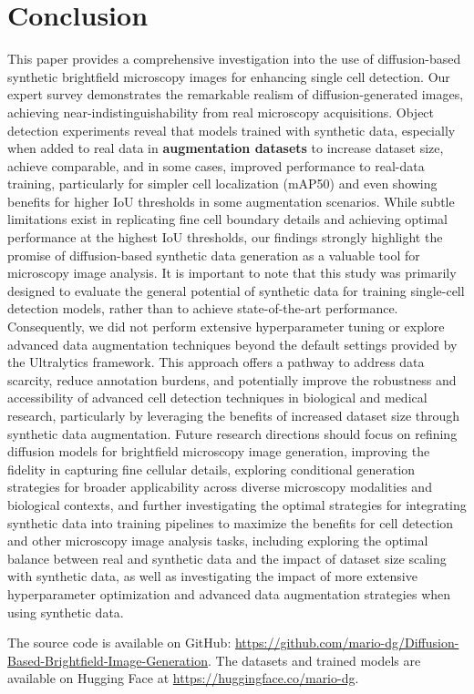 \section{Conclusion}
\label{sec:conclusion}
This paper provides a comprehensive investigation into the use of diffusion-based synthetic brightfield microscopy images for enhancing single cell detection.
Our expert survey demonstrates the remarkable realism of diffusion-generated images, achieving near-indistinguishability from real microscopy acquisitions.
Object detection experiments reveal that models trained with synthetic data, especially when added to real data in \textbf{augmentation datasets} to increase dataset size, achieve comparable, and in some cases,
improved performance to real-data training, particularly for simpler cell localization (mAP\@50) and even showing benefits for higher IoU thresholds in some augmentation scenarios.
While subtle limitations exist in  replicating fine cell boundary details and achieving optimal performance at the highest IoU thresholds, our findings strongly highlight the promise of diffusion-based synthetic data generation as a valuable tool for microscopy image analysis.
It is important to note that this study was primarily designed to evaluate the general potential of synthetic data for training single-cell detection models, rather than to achieve state-of-the-art performance.
Consequently, we did not perform extensive hyperparameter tuning or explore advanced data augmentation techniques beyond the default settings provided by the Ultralytics framework.
This approach offers a pathway to address data scarcity, reduce annotation burdens, and potentially improve the robustness and accessibility of advanced cell detection techniques in biological and medical research,
particularly by leveraging the benefits of increased dataset size through synthetic data augmentation.
Future research directions should focus on refining diffusion models for brightfield microscopy image generation, improving the fidelity in capturing fine cellular details,
exploring conditional generation strategies for broader applicability across diverse microscopy modalities and biological contexts, and further investigating the optimal strategies for integrating synthetic data into training pipelines
to maximize the benefits for cell detection and other microscopy image analysis tasks, including exploring the optimal balance between real and synthetic data and the impact of dataset size scaling with synthetic data,
as well as investigating the impact of more extensive hyperparameter optimization and advanced data augmentation strategies when using synthetic data.

The source code is available on GitHub:
\url{https://github.com/mario-dg/Diffusion-Based-Brightfield-Image-Generation}.
The datasets and trained models are available on Hugging Face at \url{https://huggingface.co/mario-dg}.
